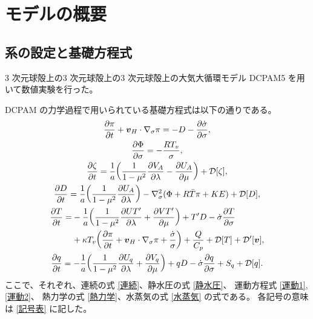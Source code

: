 \documentclass[body]{subfiles}
\begin{document}
\chapter{モデルの概要}

\section{系の設定と基礎方程式}
3 次元球殻上の3 次元球殻上の3 次元球殻上の大気大循環モデル DCPAM5 を用いて数値実験を行った。

DCPAM の力学過程で用いられている基礎方程式は以下の通りである。
\begin{gather}
	\pdv{\pi}{t}+\vb*{v}_H\cdot\nabla_\sigma\pi=-D-\pdv{\dot \sigma}{\sigma},\label{連続}\\
	\pdv{\Phi}{\sigma}=-\frac{RT_v}{\sigma},\label{静水圧}\\
	\pdv{\zeta}{t}=\frac{1}{a}\qty(\frac{1}{1-\mu^2}\pdv{V_A}{\lambda}-\pdv{U_A}{\mu})+\mathcal{D}[\zeta],\label{運動1}\\
	\pdv{D}{t}=\frac{1}{a}\qty(\frac{1}{1-\mu^2}\pdv{U_A}{\lambda})
		-\nabla^2_\sigma(\Phi+R\bar T\pi+KE)+\mathcal{D}[D],\label{運動2}\\
	\begin{split}
		\pdv{T}{t}=&-\frac{1}{a}\qty(\frac{1}{1-\mu^2}\pdv{UT'}{\lambda}+\pdv{VT'}{\mu})+T'D-\dot\sigma\pdv{T}{\sigma}\\
		&+\kappa T_v\qty(\pdv{\pi}{t}+\vb*{v}_H\cdot\nabla_\sigma\pi+\frac{\dot\sigma}{\sigma})
			+\frac{Q}{C_p}+\mathcal{D}[T]+\mathcal{D}'[\vb*{v}],
	\end{split}\label{熱力学}\\
	\pdv{q}{t}=-\frac{1}{a}\qty(\frac{1}{1-\mu^2}\pdv{U_q}{\lambda}+\pdv{V_q}{\mu})
		+qD-\dot\sigma\pdv{q}{\sigma}+S_q+\mathcal{D}[q].\label{水蒸気}
\end{gather}
ここで、それぞれ、連続の式 \eqref{連続}、静水圧の式 \eqref{静水圧}、
運動方程式 \eqref{運動1}, \eqref{運動2}、
熱力学の式 \eqref{熱力学}、水蒸気の式 \eqref{水蒸気} の式である。
各記号の意味は \ref{記号表} に記した。
\end{document}
